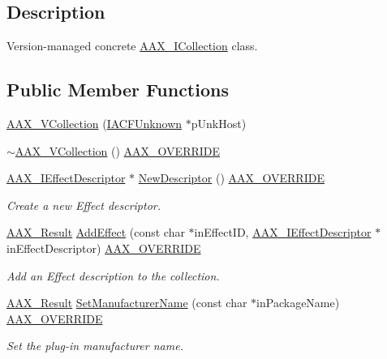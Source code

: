 \subsection{Description}
Version-\/managed concrete \mbox{\hyperlink{a01777}{A\+A\+X\+\_\+\+I\+Collection}} class. \subsection*{Public Member Functions}
\begin{DoxyCompactItemize}
\item 
\mbox{\hyperlink{a01897_a68a62b3180bba5ede9b57402a241d8a5}{A\+A\+X\+\_\+\+V\+Collection}} (\mbox{\hyperlink{a01409}{I\+A\+C\+F\+Unknown}} $\ast$p\+Unk\+Host)
\item 
\mbox{\hyperlink{a01897_a1ce394bb2ce45e72174d2d85c868c454}{$\sim$\+A\+A\+X\+\_\+\+V\+Collection}} () \mbox{\hyperlink{a00392_ac2f24a5172689ae684344abdcce55463}{A\+A\+X\+\_\+\+O\+V\+E\+R\+R\+I\+DE}}
\item 
\mbox{\hyperlink{a01813}{A\+A\+X\+\_\+\+I\+Effect\+Descriptor}} $\ast$ \mbox{\hyperlink{a01897_a4f7845b62f8403ca700706500d54473b}{New\+Descriptor}} () \mbox{\hyperlink{a00392_ac2f24a5172689ae684344abdcce55463}{A\+A\+X\+\_\+\+O\+V\+E\+R\+R\+I\+DE}}
\begin{DoxyCompactList}\small\item\em Create a new Effect descriptor. \end{DoxyCompactList}\item 
\mbox{\hyperlink{a00392_a4d8f69a697df7f70c3a8e9b8ee130d2f}{A\+A\+X\+\_\+\+Result}} \mbox{\hyperlink{a01897_a33db3bfe44af490cb86d174d083449fa}{Add\+Effect}} (const char $\ast$in\+Effect\+ID, \mbox{\hyperlink{a01813}{A\+A\+X\+\_\+\+I\+Effect\+Descriptor}} $\ast$in\+Effect\+Descriptor) \mbox{\hyperlink{a00392_ac2f24a5172689ae684344abdcce55463}{A\+A\+X\+\_\+\+O\+V\+E\+R\+R\+I\+DE}}
\begin{DoxyCompactList}\small\item\em Add an Effect description to the collection. \end{DoxyCompactList}\item 
\mbox{\hyperlink{a00392_a4d8f69a697df7f70c3a8e9b8ee130d2f}{A\+A\+X\+\_\+\+Result}} \mbox{\hyperlink{a01897_a34a70df2b1c4a6b2c13cbee18e463341}{Set\+Manufacturer\+Name}} (const char $\ast$in\+Package\+Name) \mbox{\hyperlink{a00392_ac2f24a5172689ae684344abdcce55463}{A\+A\+X\+\_\+\+O\+V\+E\+R\+R\+I\+DE}}
\begin{DoxyCompactList}\small\item\em Set the plug-\/in manufacturer name. \end{DoxyCompactList}\item 

\end{DoxyCompactItemize}
